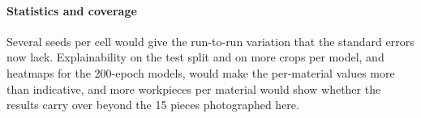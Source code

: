 \paragraph{Statistics and coverage}
Several seeds per cell would give the run-to-run variation that the standard errors now
lack. Explainability on the test split and on more crops per model, and heatmaps for the
200-epoch models, would make the per-material values more than indicative, and more
workpieces per material would show whether the results carry over beyond the 15 pieces
photographed here.
